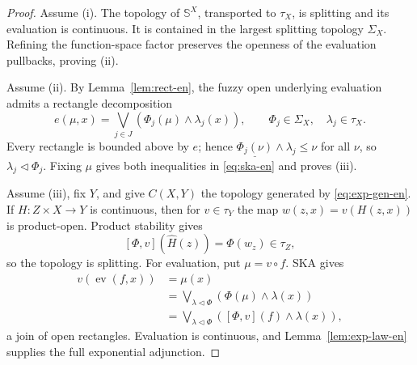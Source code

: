 \documentclass[10pt,a4paper]{amsart}
\numberwithin{equation}{section}
\newcommand{\Sier}{\mathbb S}
\newcommand{\const}[1]{\underline{#1}}
\newcommand{\ev}{\operatorname{ev}}
\begin{document}
\begin{proof}
Assume (i).  The topology of \(\Sier^X\), transported to \(\tau_X\),
is splitting and its evaluation is continuous.  It is contained in the
largest splitting topology \(\Sigma_X\).  Refining the function-space
factor preserves the openness of the evaluation pullbacks, proving (ii).

Assume (ii).  By Lemma~\ref{lem:rect-en}, the fuzzy open underlying
evaluation admits a rectangle decomposition
\[
 e(\mu,x)=\bigvee_{j\in J}
       (\Phi_j(\mu)\wedge\lambda_j(x)),
 \qquad \Phi_j\in\Sigma_X,\quad\lambda_j\in\tau_X.
\]
Every rectangle is bounded above by \(e\); hence
\(\const{\Phi_j(\nu)}\wedge\lambda_j\leq\nu\) for all \(\nu\), so
\(\lambda_j\triangleleft\Phi_j\).  Fixing \(\mu\) gives both inequalities
in \eqref{eq:ska-en} and proves (iii).

Assume (iii), fix \(Y\), and give \(C(X,Y)\) the topology generated by
\eqref{eq:exp-gen-en}.  If \(H:Z\times X\to Y\) is continuous, then for
\(v\in\tau_Y\) the map \(w(z,x)=v(H(z,x))\) is product-open.  Product
stability gives
\[
 [\Phi,v](\widehat H(z))=\Phi(w_z)\in\tau_Z,
\]
so the topology is splitting.  For evaluation, put \(\mu=v\circ f\).
SKA gives
\begin{align*}
 v(\ev(f,x))
 &=\mu(x)\\
 &=\bigvee_{\lambda\triangleleft\Phi}
   (\Phi(\mu)\wedge\lambda(x))\\
 &=\bigvee_{\lambda\triangleleft\Phi}
   ([\Phi,v](f)\wedge\lambda(x)),
\end{align*}
a join of open rectangles.  Evaluation is continuous, and
Lemma~\ref{lem:exp-law-en} supplies the full exponential adjunction.
\end{proof}
\end{document}
